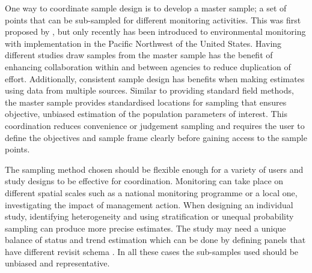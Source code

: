 \documentclass[titlepage]{article}
\begin{document}
One way to coordinate sample design is to develop a master sample; a set of points that can be sub-sampled for different monitoring activities. This was first proposed by \citep{King1945}, but only recently has been introduced to environmental monitoring \citep{LarsenOlsenStevens2008, theobald2016} with implementation in the Pacific Northwest of the United States. Having different studies draw samples from the master sample has the benefit of enhancing collaboration within and between agencies to reduce duplication of effort. Additionally, consistent sample design has benefits when making estimates using data from multiple sources. Similar to providing standard field methods, the master sample provides standardised locations for sampling that ensures objective, unbiased estimation of the population parameters of interest. This coordination reduces convenience or judgement sampling and requires the user to define the objectives and sample frame clearly before gaining access to the sample points. 

The sampling method chosen should be flexible enough for a variety of users and study designs to be effective for coordination. Monitoring can take place on different spatial scales such as a national monitoring programme or a local one, investigating the impact of management action. When designing an individual study, identifying heterogeneity and using stratification \citep{Yoccoz2001} or unequal probability sampling \citep{Stevens1997} can produce more precise estimates. The study may need a unique balance of status and trend estimation which can be done by defining panels that have different revisit schema \citep{Skalski1990, StevensOlsen1999, Mcdonald2003}. In all these cases the sub-samples used should be unbiased and representative.
\end{document}
